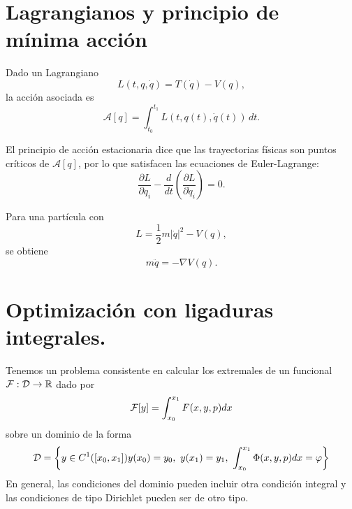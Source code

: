 \documentclass[12pt]{book}
\begin{document}
    \section{Lagrangianos y principio de mínima acción}
    Dado un Lagrangiano
    \[
    L(t,q,\dot q)=T(\dot q)-V(q),
    \]
    la acción asociada es
    \[
    \mathcal A[q]=\int_{t_0}^{t_1}L(t,q(t),\dot q(t))\,dt.
    \]

    El principio de acción estacionaria dice que las trayectorias físicas son puntos críticos de $\mathcal A[q]$, por lo que satisfacen las ecuaciones de Euler-Lagrange:
    \[
    \frac{\partial L}{\partial q_i}
    -
    \frac{d}{dt}\left(\frac{\partial L}{\partial \dot q_i}\right)=0.
    \]

    Para una partícula con
    \[
    L=\frac12m|\dot q|^2-V(q),
    \]
    se obtiene
    \[
    m\ddot q=-\nabla V(q).
    \]

    \section{Optimización con ligaduras integrales.}

    Tenemos un problema consistente en calcular los extremales de un funcional $\mathcal{F}:\mathcal{D} \to \mathbb{R}$ dado por 
    \begin{gather*}
        \mathcal{F}[y] = \int_{x_0}^{x_1} F(x,y,p) dx
    \end{gather*}
    sobre un dominio de la forma 
    \begin{gather*}
        \cc{D} = \left\{ y\in C^1([x_0, x_1]) y(x_0)=y_0,\ y(x_1)=y_1,\ \int_{x_0}^{x_1} \Phi(x,y,p) dx = \varphi \right\}
    \end{gather*}
    En general, las condiciones del dominio pueden incluir otra condición integral y las condiciones de tipo Dirichlet pueden ser de otro tipo. \\
\end{document}
